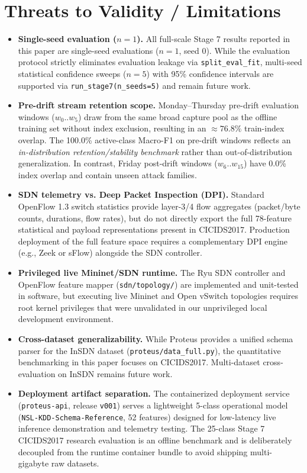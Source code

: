 \documentclass[conference]{IEEEtran}
\begin{document}
\section{Threats to Validity / Limitations}
\label{sec:threats}

\begin{itemize}
  \item \textbf{Single-seed evaluation ($n=1$).} All full-scale Stage 7 results reported in this paper are single-seed evaluations ($n=1$, seed 0). While the evaluation protocol strictly eliminates evaluation leakage via \texttt{split\_eval\_fit}, multi-seed statistical confidence sweeps ($n=5$) with 95\% confidence intervals are supported via \texttt{run\_stage7(n\_seeds=5)} and remain future work.
  \item \textbf{Pre-drift stream retention scope.} Monday--Thursday pre-drift evaluation windows ($w_0..w_5$) draw from the same broad capture pool as the offline training set without index exclusion, resulting in an $\approx 76.8\%$ train-index overlap. The 100.0\% active-class Macro-F1 on pre-drift windows reflects an \textit{in-distribution retention/stability benchmark} rather than out-of-distribution generalization. In contrast, Friday post-drift windows ($w_6..w_{15}$) have 0.0\% index overlap and contain unseen attack families.
  \item \textbf{SDN telemetry vs. Deep Packet Inspection (DPI).} Standard OpenFlow 1.3 switch statistics provide layer-3/4 flow aggregates (packet/byte counts, durations, flow rates), but do not directly export the full 78-feature statistical and payload representations present in CICIDS2017. Production deployment of the full feature space requires a complementary DPI engine (e.g., Zeek or sFlow) alongside the SDN controller.
  \item \textbf{Privileged live Mininet/SDN runtime.} The Ryu SDN controller and OpenFlow feature mapper (\texttt{sdn/topology/}) are implemented and unit-tested in software, but executing live Mininet and Open vSwitch topologies requires root kernel privileges that were unvalidated in our unprivileged local development environment.
  \item \textbf{Cross-dataset generalizability.} While Proteus provides a unified schema parser for the InSDN dataset (\texttt{proteus/data\_full.py}), the quantitative benchmarking in this paper focuses on CICIDS2017. Multi-dataset cross-evaluation on InSDN remains future work.
  \item \textbf{Deployment artifact separation.} The containerized deployment service (\texttt{proteus-api}, release \texttt{v001}) serves a lightweight 5-class operational model (\texttt{NSL-KDD-Schema-Reference}, 52 features) designed for low-latency live inference demonstration and telemetry testing. The 25-class Stage 7 CICIDS2017 research evaluation is an offline benchmark and is deliberately decoupled from the runtime container bundle to avoid shipping multi-gigabyte raw datasets.
\end{itemize}
\end{document}
